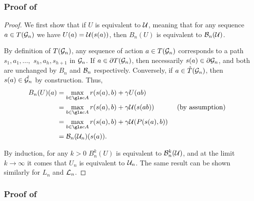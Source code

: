 \begin{subappendices}
\subsubsection{Proof of }
\begin{proof}
	
We first show that if $U$ is equivalent to $\mathcal{U}$, meaning that for any sequence $a\in T(\mathcal{G}_n)$ we have $U(a) = \mathcal{U}(s(a))$, then $B_n(U)$ is equivalent to $\mathcal{B}_n(\mathcal{U})$.

By definition of $T(\mathcal{G}_n)$, any sequence of action $a\in T(\mathcal{G}_n)$ corresponds to a path $s_1, a_1,\dots,$ $s_{h}, a_{h}, s_{h+1}$ in $\mathcal{G}_n$. If $a\in{\partial T(\mathcal{G}_n)}$, then necessarily $s(a)\in{\partial \mathcal{G}_n}$, and both are unchanged by $B_n$ and $\mathcal{B}_n$ respectively. Conversely, if $a\in\mathring{T}(\mathcal{G}_n)$, then $s(a)\in\mathring{\mathcal{G}_n}$ by construction. Thus, 
\begin{align*}
B_n(U)(a) &= \max_{b\in \cA} r(s(a), b) + \gamma U({ab}) &\\
&= \max_{b\in \cA} r(s(a), b) + \gamma \cU(s({ab})) &\text{ (by assumption)} \\
&= \max_{b\in \cA} r(s(a), b) + \gamma \cU(P(s({a}),b))\\
&= \cB_n(\cU_n)(s(a)).
\end{align*}

By induction, for any $k>0$ $B_n^k(U)$ is equivalent to $\mathcal{B}_n^k(\mathcal{U})$, and at the limit $k\rightarrow\infty$ it comes that $U_n$ is equivalent to $\mathcal{U}_n$. The same result can be shown similarly for $L_n$ and $\mathcal{L}_n$.
\end{proof}

\subsubsection{Proof of }


\end{subappendices}
